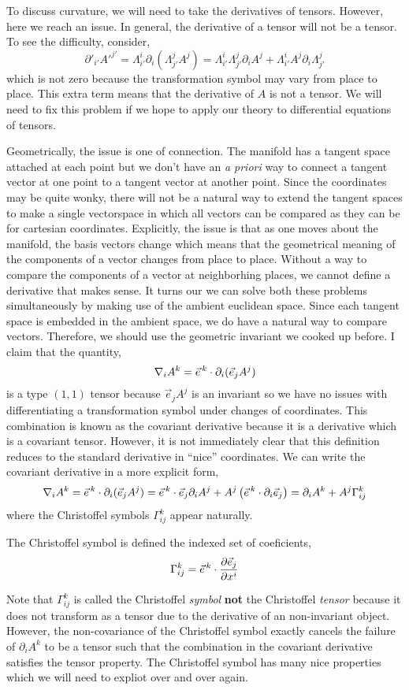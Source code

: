 \documentclass[11pt, a4paper]{article}
\begin{document}
To discuss curvature, we will need to take the derivatives of tensors. However, here we reach an issue. In general, the derivative of a tensor will not be a tensor. To see the difficulty, consider,
\[ \partial'_{i'} A'^{j'} = \Lambda_{i'}^i \partial_i (\Lambda^j_{j'} A^j) = \Lambda_{i'}^i \Lambda^j_{j'} \partial_i  A^j +  \Lambda_{i'}^i A^j \partial_i \Lambda^j_{j'} \]
which is not zero because the transformation symbol may vary from place to place. This extra term means that the derivative of $A$ is not a tensor. We will need to fix this problem if we hope to apply our theory to differential equations of tensors. 
\par
Geometrically, the issue is one of connection. The manifold has a tangent space attached at each point but we don't have an \textit{a priori} way to connect a tangent vector at one point to a tangent vector at another point. Since the coordinates may be quite wonky, there will not be a natural way to extend the tangent spaces to make a single vectorspace in which all vectors can be compared as they can be for cartesian coordinates. Explicitly, the issue is that as one moves about the manifold, the basis vectors change which means that the geometrical meaning of the components of a vector changes from place to place. Without a way to compare the components of a vector at neighborhing places, we cannot define a derivative that makes sense. It turns our we can solve both these problems simultaneously by making use of the ambient euclidean space. Since each tangent space is embedded in the ambient space, we do have a natural way to compare vectors. Therefore, we should use the geometric invariant we cooked up before. I claim that the quantity,
\[ \nabla_i A^k =  \vec{e}^{\, k} \cdot \partial_i (\vec{e}_j A^j) \]
is a type $(1, 1)$ tensor because $\vec{e}_j A^j$ is an invariant so we have no issues with differentiating a transformation symbol under changes of coordinates. This combination is known as the covariant derivative because it is a derivative which is a covariant tensor. However, it is not immediately clear that this definition reduces to the standard derivative in ``nice'' coordinates. We can write the covariant derivative in a more explicit form,
\[ \nabla_i A^k =  \vec{e}^{\, k} \cdot \partial_i (\vec{e}_j A^j) = \vec{e}^{\, k} \cdot \vec{e}_j \partial_i A^j + A^j \left( \vec{e}^{\, k} \cdot \partial_i \vec{e}_j \right) = \partial_i A^k + A^j \Gamma^k_{ij} \]
where the Christoffel symbols $\Gamma^k_{ij}$ appear naturally.

\begin{definition}
The Christoffel symbol is defined the indexed set of coeficients,
\[ \Gamma^k_{ij} = \vec{e}^{\, k} \cdot \frac{\partial{\vec{e}_j}}{\partial{x^i}} \]
\end{definition}  
Note that $\Gamma^k_{ij}$ is called the Christoffel \textit{symbol} \textbf{not} the Christoffel \textit{tensor} because it does not transform as a tensor due to the derivative of an non-invariant object. However, the non-covariance of the Christoffel symbol exactly cancels the failure of $\partial_i A^k$ to be a tensor such that the combination in the covariant derivative satisfies the tensor property. The Christoffel symbol has many nice properties which we will need to expliot over and over again.
\end{document}
